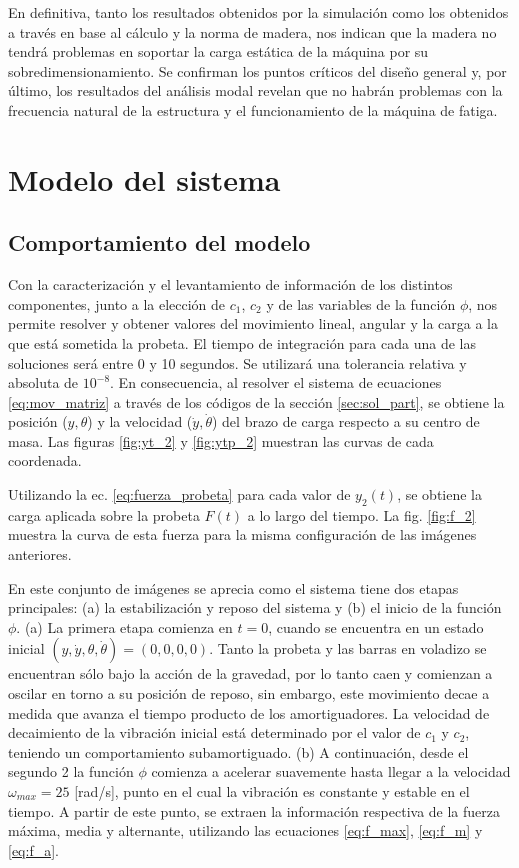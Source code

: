 En definitiva, tanto los resultados obtenidos por la simulación como los obtenidos a través en base al cálculo y la norma de madera, nos indican que la madera no tendrá problemas en soportar la carga estática de la máquina por su sobredimensionamiento. Se confirman los puntos críticos del diseño general y, por último, los resultados del análisis modal revelan que no habrán problemas con la frecuencia natural de la estructura y el funcionamiento de la máquina de fatiga.

\section{Modelo del sistema}

\subsection{Comportamiento del modelo}
Con la caracterización y el levantamiento de información de los distintos componentes, junto a la elección de $c_1$, $c_2$ y de las variables de la función $\phi$, nos permite resolver y obtener valores del movimiento lineal, angular y la carga a la que está sometida la probeta. El tiempo de integración para cada una de las soluciones será entre 0 y 10 segundos. Se utilizará una tolerancia relativa y absoluta de $10^{-8}$. En consecuencia, al resolver el sistema de ecuaciones \ref{eq:mov_matriz} a través de los códigos de la sección \ref{sec:sol_part}, se obtiene la posición ($y,\theta$) y la velocidad ($\dot{y},\dot{\theta}$) del brazo de carga respecto a su centro de masa. Las figuras \ref{fig:yt_2} y \ref{fig:ytp_2} muestran las curvas de cada coordenada.

Utilizando la ec. \ref{eq:fuerza_probeta} para cada valor de $y_2(t)$, se obtiene la carga aplicada sobre la probeta $F(t)$ a lo largo del tiempo. La fig. \ref{fig:f_2} muestra la curva de esta fuerza para la misma configuración de las imágenes anteriores.  

En este conjunto de imágenes se aprecia como el sistema tiene dos etapas principales: (a) la estabilización y reposo del sistema y (b) el inicio de la función $\phi$. (a) La primera etapa comienza en $t=0$, cuando se encuentra en un estado inicial $(y, \dot{y}, \theta, \dot{\theta}) = (0,0,0,0)$. Tanto la probeta y las barras en voladizo se encuentran sólo bajo la acción de la gravedad, por lo tanto caen y comienzan a oscilar en torno a su posición de reposo, sin embargo, este movimiento decae a medida que avanza el tiempo producto de los amortiguadores. La velocidad de decaimiento de la vibración inicial está determinado por el valor de $c_1$ y $c_2$, teniendo un comportamiento subamortiguado. (b) A continuación, desde el segundo 2 la función $\phi$ comienza a acelerar suavemente hasta llegar a la velocidad $\omega_{max} = 25$ [rad/s], punto en el cual la vibración es constante y estable en el tiempo. A partir de este punto, se extraen la información respectiva de la fuerza máxima, media y alternante, utilizando las ecuaciones \ref{eq:f_max}, \ref{eq:f_m} y \ref{eq:f_a}. 

